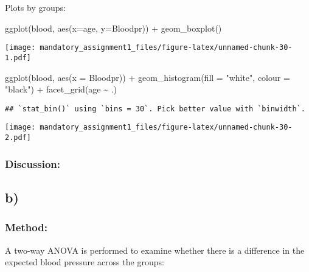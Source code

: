 \documentclass[
]{article}
\newenvironment{Shaded}{\begin{snugshade}}{\end{snugshade}}
\newcommand{\AttributeTok}[1]{\textcolor[rgb]{0.77,0.63,0.00}{#1}}
\newcommand{\FunctionTok}[1]{\textcolor[rgb]{0.00,0.00,0.00}{#1}}
\newcommand{\NormalTok}[1]{#1}
\newcommand{\SpecialCharTok}[1]{\textcolor[rgb]{0.00,0.00,0.00}{#1}}
\newcommand{\StringTok}[1]{\textcolor[rgb]{0.31,0.60,0.02}{#1}}
\begin{document}
Plots by groups:

\begin{Shaded}
\begin{Highlighting}[]
\FunctionTok{ggplot}\NormalTok{(blood, }\FunctionTok{aes}\NormalTok{(}\AttributeTok{x=}\NormalTok{age, }\AttributeTok{y=}\NormalTok{Bloodpr)) }\SpecialCharTok{+} 
    \FunctionTok{geom\_boxplot}\NormalTok{()}
\end{Highlighting}
\end{Shaded}

\texttt{[image: mandatory\_assignment1\_files/figure-latex/unnamed-chunk-30-1.pdf]}

\begin{Shaded}
\begin{Highlighting}[]
\FunctionTok{ggplot}\NormalTok{(blood, }\FunctionTok{aes}\NormalTok{(}\AttributeTok{x =}\NormalTok{ Bloodpr)) }\SpecialCharTok{+}
  \FunctionTok{geom\_histogram}\NormalTok{(}\AttributeTok{fill =} \StringTok{"white"}\NormalTok{, }\AttributeTok{colour =} \StringTok{"black"}\NormalTok{) }\SpecialCharTok{+}
  \FunctionTok{facet\_grid}\NormalTok{(age }\SpecialCharTok{\textasciitilde{}}\NormalTok{ .)}
\end{Highlighting}
\end{Shaded}

\begin{verbatim}
## `stat_bin()` using `bins = 30`. Pick better value with `binwidth`.
\end{verbatim}

\texttt{[image: mandatory\_assignment1\_files/figure-latex/unnamed-chunk-30-2.pdf]}

\hypertarget{discussion-3}{%
\subsubsection{Discussion:}\label{discussion-3}}

\hypertarget{b-1}{%
\subsection{b)}\label{b-1}}

\hypertarget{method-6}{%
\subsubsection{Method:}\label{method-6}}

A two-way ANOVA is performed to examine whether there is a difference in
the expected blood pressure across the groups:
\end{document}
